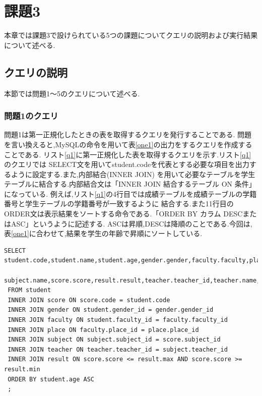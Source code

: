 \documentclass[a4j]{jarticle}
\begin{document}
    \section{課題3}
    本章では課題3で設けられている5つの課題についてクエリの説明および実行結果について述べる.
    \subsection{クエリの説明}
    本節では問題1～5のクエリについて述べる.
    \subsubsection{問題1のクエリ}
    問題1は第一正規化したときの表を取得するクエリを発行することである.
    問題を言い換えると,MySQLの命令を用いて表\ref{one1}の出力をするクエリを作成することである.
    リスト\ref{q1}に第一正規化した表を取得するクエリを示す.リスト\ref{q1}のクエリでは
    SELECT文を用いてstudent.codeを代表とする必要な項目を出力するように設定する.また,内部結合(INNER JOIN)
    を用いて必要なテーブルを学生テーブルに結合する.内部結合文は「INNER JOIN 結合するテーブル ON 条件」になっている.
    例えば,リスト\ref{q1}の4行目では成績テーブルを成績テーブルの学籍番号と学生テーブルの学籍番号が一致するように
    結合する.また11行目のORDER文は表示結果をソートする命令である.「ORDER BY カラム DESCまたはASC」というように記述する.
    ASCは昇順,DESCは降順のことである.今回は,表\ref{one1}に合わせて,結果を学生の年齢で昇順にソートしている.

    \begin{lstlisting}[basicstyle=\ttfamily\footnotesize, frame=single,label=q1,caption=問題1のクエリ]
 SELECT student.code,student.name,student.age,gender.gender,faculty.faculty,place.place,
 subject.name,score.score,result.result,teacher.teacher_id,teacher.name,score.date
 FROM student  
 INNER JOIN score ON score.code = student.code
 INNER JOIN gender ON student.gender_id = gender.gender_id 
 INNER JOIN faculty ON student.faculty_id = faculty.faculty_id
 INNER JOIN place ON faculty.place_id = place.place_id
 INNER JOIN subject ON subject.subject_id = score.subject_id
 INNER JOIN teacher ON teacher.teacher_id = subject.teacher_id
 INNER JOIN result ON score.score <= result.max AND score.score >= result.min  
 ORDER BY student.age ASC
 ;
        \end{lstlisting}
\end{document}
